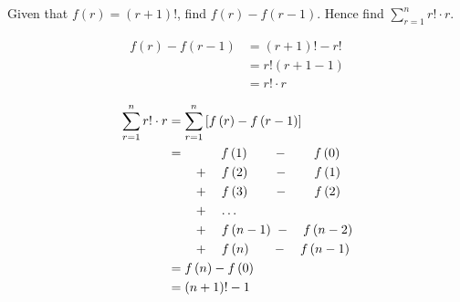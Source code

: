 \documentclass[11pt,a4paper]{book}
\begin{document}
\newpage

\begin{example} 

Given that $f\left(r\right)=\left(r+1\right)!$, find $f\left(r\right)-f\left(r-1\right)$.
Hence find ${\displaystyle \sum_{r=1}^{n}r!\cdot r}$.

\Solution

\begin{align*}
f\left(r\right)-f\left(r-1\right) & =\left(r+1\right)!-r!\\
 & =r!\left(r+1-1\right)\\
 & =r!\cdot r
\end{align*}

\begin{align*}
\sum_{r=1}^{n}r!\cdot r & =\sum_{r=1}^{n}\left[f\left(r\right)-f\left(r-1\right)\right]\\
 & =\hspace{1cm}{f\left(1\right)}\qquad-\qquad f\left(0\right)\\
 & \qquad+\quad{f\left(2\right)}\qquad-\qquad{f\left(1\right)}\\
 & \qquad+\quad{f\left(3\right)}\qquad-\qquad{f\left(2\right)}\\
 & \qquad+\quad\ldots\\
 & \qquad+\quad{f\left(n-1\right)}\hspace{0.3em}-\quad{f\left(n-2\right)}\\
 & \qquad+\quad f\left(n\right)\hspace{0.63cm}-\quad{f\left(n-1\right)}\\
 & =f\left(n\right)-f\left(0\right)\\
 & =\left(n+1\right)!-1
\end{align*}

\end{example}
\end{document}
